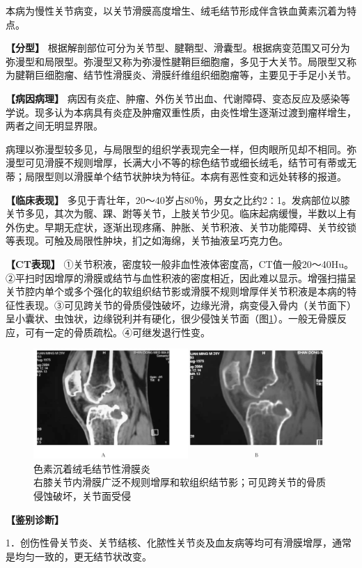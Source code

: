 本病为慢性关节病变，以关节滑膜高度增生、绒毛结节形成伴含铁血黄素沉着为特点。

\textbf{【分型】}
根据解剖部位可分为关节型、腱鞘型、滑囊型。根据病变范围又可分为弥漫型和局限型。弥漫型又称为弥漫性腱鞘巨细胞瘤，多见于大关节。局限型又称为腱鞘巨细胞瘤、结节性滑膜炎、滑膜纤维组织细胞瘤等，主要见于手足小关节。

\textbf{【病因病理】}
病因有炎症、肿瘤、外伤关节出血、代谢障碍、变态反应及感染等学说。现多认为本病具有炎症及肿瘤双重性质，由炎性增生逐渐过渡到瘤样增生，两者之间无明显界限。

病理以弥漫型较多见，与局限型的组织学表现完全一样，但肉眼所见却不相同。弥漫型可见滑膜不规则增厚，长满大小不等的棕色结节或细长绒毛，结节可有蒂或无蒂；局限型则以滑膜单个结节状肿块为特征。本病有恶性变和远处转移的报道。

\textbf{【临床表现】}
多见于青壮年，20～40岁占80％，男女之比约2∶1。发病部位以膝关节多见，其次为髋、踝、跗等关节，上肢关节少见。临床起病缓慢，半数以上有外伤史。早期无症状，逐渐出现疼痛、肿胀、关节积液、关节功能障碍、关节绞锁等表现。可触及局限性肿块，扪之如海绵，关节抽液呈巧克力色。

\textbf{【CT表现】}
①关节积液，密度较一般非血性液体密度高，CT值一般20～40Hu。②平扫时因增厚的滑膜或结节与血性积液的密度相近，因此难以显示。增强扫描呈关节腔内单个或多个强化的软组织结节影或滑膜不规则增厚伴关节积液是本病的特征性表现。③可见跨关节的骨质侵蚀破坏，边缘光滑，病变侵入骨内（关节面下）呈小囊状、虫蚀状，边缘锐利并有硬化，很少侵蚀关节面（图\ref{fig22-33}）。一般无骨膜反应，可有一定的骨质疏松。④可继发退行性变。

\begin{figure}[!htbp]
 \centering
 \includegraphics[width=.7\textwidth,height=\textheight,keepaspectratio]{./images/Image00459.jpg}
 \captionsetup{justification=centering}
 \caption{色素沉着绒毛结节性滑膜炎\\{\small 右膝关节内滑膜广泛不规则增厚和软组织结节影；可见跨关节的骨质侵蚀破坏，关节面受侵}}
 \label{fig22-33}
  \end{figure} 

\textbf{【鉴别诊断】}

1．创伤性骨关节炎、关节结核、化脓性关节炎及血友病等均可有滑膜增厚，通常是均匀一致的，更无结节状改变。

